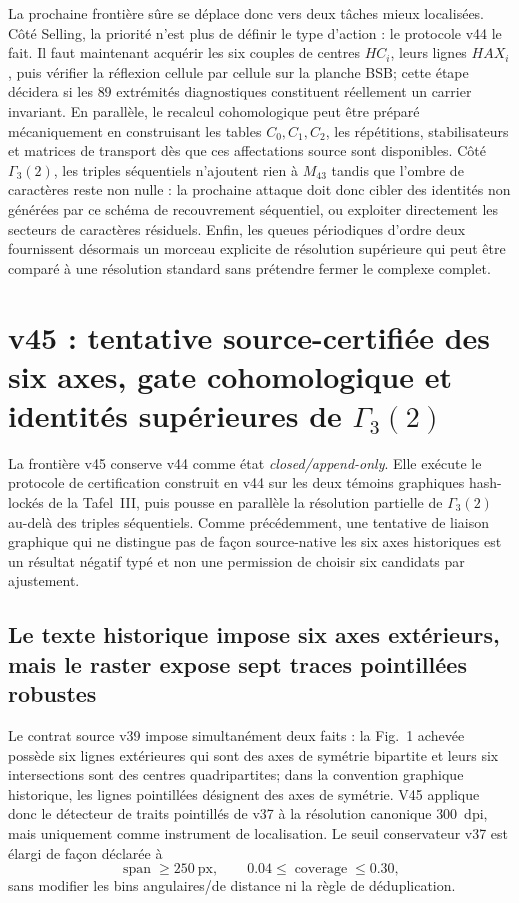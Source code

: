 \documentclass[11pt,a4paper]{article}
\begin{document}
La prochaine frontière sûre se déplace donc vers deux tâches mieux localisées. Côté Selling, la priorité n'est plus de définir le type d'action : le protocole v44 le fait. Il faut maintenant acquérir les six couples de centres $HC_i$, leurs lignes $HAX_i$, puis vérifier la réflexion cellule par cellule sur la planche BSB; cette étape décidera si les $89$ extrémités diagnostiques constituent réellement un carrier invariant. En parallèle, le recalcul cohomologique peut être préparé mécaniquement en construisant les tables $C_0,C_1,C_2$, les répétitions, stabilisateurs et matrices de transport dès que ces affectations source sont disponibles. Côté $\Gamma_3(2)$, les triples séquentiels n'ajoutent rien à $M_{43}$ tandis que l'ombre de caractères reste non nulle : la prochaine attaque doit donc cibler des identités non générées par ce schéma de recouvrement séquentiel, ou exploiter directement les secteurs de caractères résiduels. Enfin, les queues périodiques d'ordre deux fournissent désormais un morceau explicite de résolution supérieure qui peut être comparé à une résolution standard sans prétendre fermer le complexe complet.


\section{v45 : tentative source-certifiée des six axes, gate cohomologique et identités supérieures de $\Gamma_3(2)$}
\label{sec:v45-source-six-axis-higher-identities}

La frontière v45 conserve v44 comme état \emph{closed/append-only}. Elle exécute le protocole de certification construit en v44 sur les deux témoins graphiques hash-lockés de la Tafel~III, puis pousse en parallèle la résolution partielle de $\Gamma_3(2)$ au-delà des triples séquentiels. Comme précédemment, une tentative de liaison graphique qui ne distingue pas de façon source-native les six axes historiques est un résultat négatif typé et non une permission de choisir six candidats par ajustement.

\subsection{Le texte historique impose six axes extérieurs, mais le raster expose sept traces pointillées robustes}

Le contrat source v39 impose simultanément deux faits : la Fig.~1 achevée possède six lignes extérieures qui sont des axes de symétrie bipartite et leurs six intersections sont des centres quadripartites; dans la convention graphique historique, les lignes pointillées désignent des axes de symétrie. V45 applique donc le détecteur de traits pointillés de v37 à la résolution canonique $300$~dpi, mais uniquement comme instrument de localisation. Le seuil conservateur v37 est élargi de façon déclarée à
\[
 \operatorname{span}\ge250\ \mathrm{px},
 \qquad
 0.04\le \operatorname{coverage}\le0.30,
\]
sans modifier les bins angulaires/de distance ni la règle de déduplication.
\end{document}
